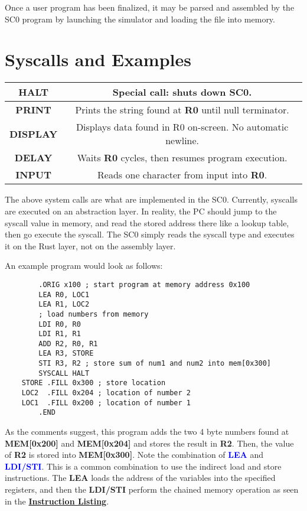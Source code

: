 \documentclass{article}
\begin{document}
\begin{tableofcontents}
\begin{Large}
Once a user program has been finalized, it may be parsed and assembled by the SC0 program by 
launching the simulator and loading the file into memory.
\end{Large}
\section{\Huge Syscalls and Examples}
\begin{center}
\begin{tabular}{|c|c|}
\hline
\textbf{HALT} & Special call: shuts down SC0. \\
\hline
\textbf{PRINT} & Prints the string found at \textbf{R0} until null terminator. \\
\hline
\textbf{DISPLAY} & Displays data found in R0 on-screen. No automatic newline. \\
\hline
\textbf{DELAY} & Waits \textbf{R0} cycles, then resumes program execution. \\
\hline
\textbf{INPUT} & Reads one character from input into \textbf{R0}. \\
\hline
\end{tabular}
\end{center}
The above system calls are what are implemented in the SC0. Currently, syscalls are executed
on an abstraction layer. In reality, the PC should jump to the syscall value in memory, and read 
the stored address there like a lookup table, then go execute the syscall. The SC0 simply
reads the syscall type and executes it on the Rust layer, not on the assembly layer.

An example program would look as follows:
\begin{center}
    \begin{BVerbatim}
        .ORIG x100 ; start program at memory address 0x100
        LEA R0, LOC1
        LEA R1, LOC2
        ; load numbers from memory
        LDI R0, R0  
        LDI R1, R1
        ADD R2, R0, R1
        LEA R3, STORE
        STI R3, R2 ; store sum of num1 and num2 into mem[0x300]
        SYSCALL HALT
    STORE .FILL 0x300 ; store location
    LOC2  .FILL 0x204 ; location of number 2
    LOC1  .FILL 0x200 ; location of number 1
        .END
    \end{BVerbatim}
\end{center}
As the comments suggest, this program adds the two 4 byte numbers found at \textbf{MEM[0x200]}
and \textbf{MEM[0x204]} and stores the result in \textbf{R2}. Then, the value of \textbf{R2}
is stored into \textbf{MEM[0x300]}. Note the combination of \textcolor{blue}{\textbf{LEA}} and
\textcolor{blue}{\textbf{LDI/STI}}. This is a common combination to use the indirect load and
store instructions. The \textbf{LEA} loads the address of the variables into the specified registers,
and then the \textbf{LDI/STI} perform the chained memory operation as seen in the
\textbf{\hyperref[sec:instructionList]{Instruction Listing}}.
\end{tableofcontents}
\end{document}
